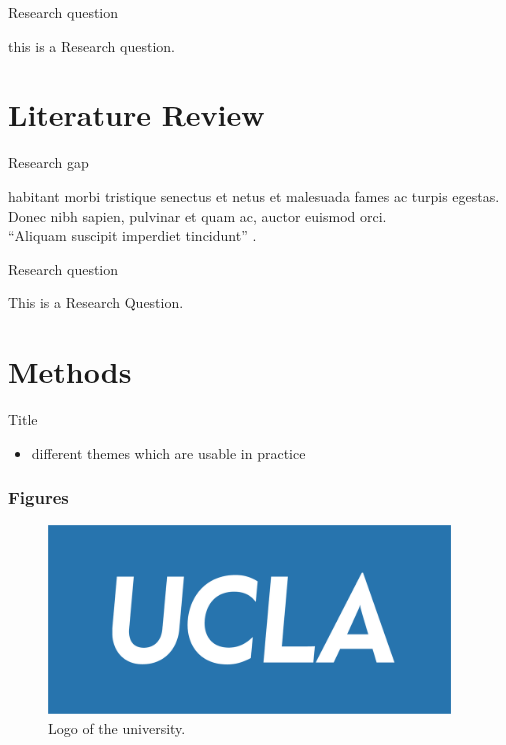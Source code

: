 \documentclass[serif, aspectratio=169]{beamer}
\begin{document}
\begin{frame}{Research question}

   this is a Research question.

\end{frame}

\section{Literature Review}
\begin{frame}{Research gap}

   \textcite{Gentzkow.Shapiro_2008} habitant morbi tristique senectus et netus et malesuada fames ac turpis egestas. Donec nibh sapien, pulvinar et quam ac, auctor euismod orci. \\[1em]
   
   \enquote{Aliquam suscipit imperdiet tincidunt} \parencite{Gentzkow.Shapiro_2008}.
   

\end{frame}

\begin{frame}{Research question}

   This is a Research Question.

\end{frame}

\section{Methods}
\begin{frame}{Title}
    \begin{itemize}
        \item different themes which are usable in practice
    \end{itemize}
\end{frame}

\begin{frame}
	\frametitle<presentation>{Figures}
	\begin{figure}
		\centering
			\includegraphics[height=5cm]{pic/ucla-logo.png}
		\caption{Logo of the university.}
		\label{fig:unilogo}
	\end{figure}
\end{frame}
\end{document}
